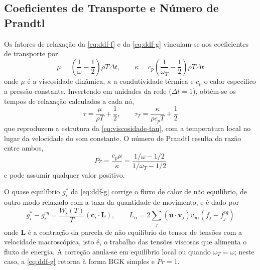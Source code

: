 
\subsection{Coeficientes de Transporte e Número de Prandtl}\label{subsec:lbm-transporte}

Os fatores de relaxação da \eqref{eq:ddf-f} e da \eqref{eq:ddf-g} vinculam-se aos coeficientes de transporte por
\begin{equation}\label{eq:coeficientes-transporte}
    \mu = \left( \frac{1}{\omega} - \frac{1}{2} \right) \rho T \Delta t, \qquad
    \kappa = c_p \left( \frac{1}{\omega_T} - \frac{1}{2} \right) \rho T \Delta t
\end{equation}
onde $\mu$ é a viscosidade dinâmica, $\kappa$ a condutividade térmica e $c_p$ o calor específico a pressão constante.
Invertendo em unidades da rede ($\Delta t = 1$), obtêm-se os tempos de relaxação calculados a cada nó,
\begin{equation}\label{eq:tempos-relaxacao}
    \tau = \frac{\mu}{\rho T} + \frac{1}{2}, \qquad
    \tau_T = \frac{\kappa}{\rho c_p T} + \frac{1}{2}
\end{equation}
que reproduzem a estrutura da \eqref{eq:viscosidade-tau}, com a temperatura local no lugar da velocidade do som constante.
O número de Prandtl resulta da razão entre ambos,
\begin{equation}\label{eq:prandtl}
    Pr = \frac{c_p \mu}{\kappa} = \frac{1/\omega - 1/2}{1/\omega_T - 1/2}
\end{equation}
e pode assumir qualquer valor positivo.

O quase equilíbrio $g_i^{*}$ da \eqref{eq:ddf-g} corrige o fluxo de calor de não equilíbrio, de outro modo relaxado com a taxa da quantidade de movimento, e é dado por
\begin{equation}\label{eq:quase-equilibrio}
    g_i^{*} - g_i^{eq} = \frac{W_i(T)}{T} \left( \mathbf{c}_i \cdot \mathbf{L} \right), \qquad
    L_\alpha = 2 \sum_j \left( \mathbf{u} \cdot \mathbf{v}_j \right) v_{j\alpha} \left( f_j - f_j^{eq} \right)
\end{equation}
onde $\mathbf{L}$ é a contração da parcela de não equilíbrio do tensor de tensões com a velocidade macroscópica, isto é, o trabalho das tensões viscosas que alimenta o fluxo de energia.
A correção anula-se em equilíbrio local ou quando $\omega_T = \omega$; neste caso, a \eqref{eq:ddf-g} retorna à forma BGK simples e $Pr = 1$.

